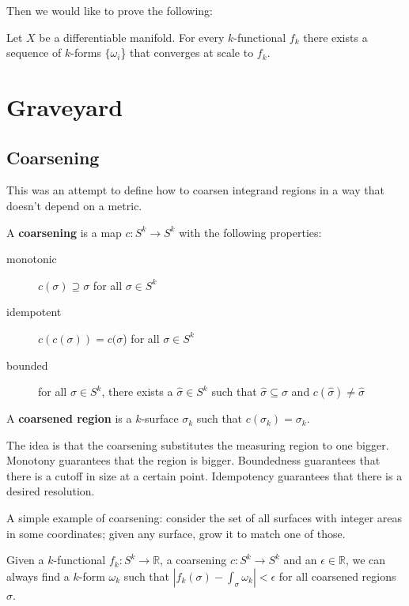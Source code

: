 \documentclass[10pt, onecolumn, longbibliography, nofootinbib]{revtex4-2}
\begin{document}
Then we would like to prove the following:

\begin{desid}
	Let $X$ be a differentiable manifold. For every $k$-functional $f_k$ there exists a sequence of $k$-forms $\{\omega_i$\} that converges at scale to $f_k$.
\end{desid}

\section{Graveyard}

\subsection{Coarsening}

This was an attempt to define how to coarsen integrand regions in a way that doesn't depend on a metric.

\begin{defn}
	A \textbf{coarsening} is a map $c : S^k \to S^k$ with the following properties:
	\begin{description}
		\item[monotonic] $c(\sigma) \supseteq \sigma$ for all $\sigma \in S^k$
		\item[idempotent] $c(c(\sigma)) = c(\sigma$) for all $\sigma \in S^k$
		\item[bounded] for all $\sigma \in S^k$, there exists a $\hat{\sigma} \in S^k$ such that $\hat{\sigma} \subseteq \sigma$ and $c(\hat{\sigma}) \neq \hat{\sigma}$
	\end{description}
	A \textbf{coarsened region} is a $k$-surface $\sigma_k$ such that $c(\sigma_k) = \sigma_k$. 
\end{defn}

\begin{remark}
	The idea is that the coarsening substitutes the measuring region to one bigger. Monotony guarantees that the region is bigger. Boundedness guarantees that there is a cutoff in size at a certain point. Idempotency guarantees that there is a desired resolution.
	
	A simple example of coarsening: consider the set of all surfaces with integer areas in some coordinates; given any surface, grow it to match one of those.
\end{remark}

\begin{desid}
	Given a $k$-functional $f_k : S^k \to \mathbb{R}$, a coarsening $c : S^k \to S^k$ and an $\epsilon \in \mathbb{R}$, we can always find a $k$-form $\omega_k$ such that $| f_k(\sigma) - \int_\sigma \omega_k | < \epsilon$ for all coarsened regions $\sigma$.
\end{desid}





\end{document}
